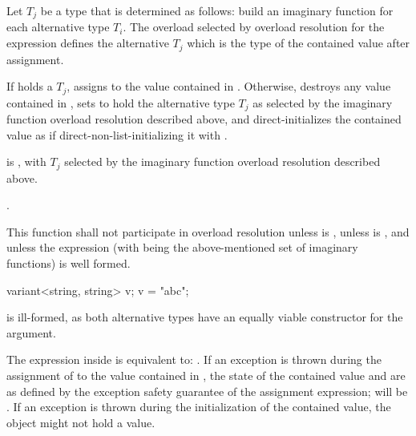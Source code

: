 \begin{itemdescr}
\pnum
Let $T_j$ be a type that is determined as follows:
build an imaginary function  for each alternative type
$T_i$. The overload  selected by overload
resolution for the expression  defines
the alternative $T_j$ which is the type of the contained value after
assignment.

\pnum
\effects
If  holds a $T_j$, assigns  to
the value contained in . Otherwise, destroys any value contained
in , sets  to hold the alternative type $T_j$
as selected by the imaginary function overload resolution described above,
and direct-initializes the contained value as if direct-non-list-initializing
it with .

\pnum
\postconditions
{} is , with $T_j$
selected by the imaginary function overload resolution described above.

\pnum
\returns {}.

\pnum
\remarks
This function shall not participate in overload resolution unless
 is , unless
 is ,
and unless the expression  (with
 being the above-mentioned set of imaginary functions)
is well formed.

\pnum
\begin{note}
\begin{codeblock}
variant<string, string> v;
v = "abc";
\end{codeblock}
is ill-formed, as both alternative types have an equally viable constructor
for the argument. \end{note}

\pnum
The expression inside  is equivalent to:
.
If an exception is thrown during the assignment of 
to the value contained in , the state of the contained value and
 are as defined by the exception safety guarantee of the assignment
expression;  will be .
If an exception is thrown during the initialization of the contained value,
the  object might not hold a value.
\end{itemdescr}

